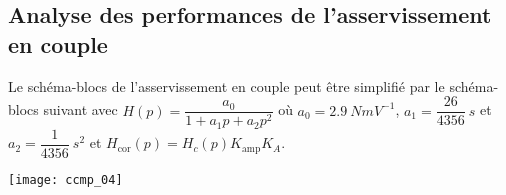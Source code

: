 %
%
%
%
%
%
%
%

\subsection*{Analyse des performances de l'asservissement en couple}
\ifprof
\else

Le schéma-blocs de l'asservissement en couple peut être simplifié par le schéma-blocs suivant avec 
$H( p)=\dfrac{a_0}{1+a_1 p+a_2 p^2}$ où 
$a_0=\SI{2,9}{NmV^{-1}}$, 
$a_1=\dfrac{26}{4356}\SI{}{s}$ et $a_2=\dfrac{1}{4356}\SI{}{s^2}$ et $H_{\text{cor}}( p)=H_c (p)K_{\text{amp}}K_A$.
\begin{center}
\texttt{[image: ccmp\_04]}

\end{center}




